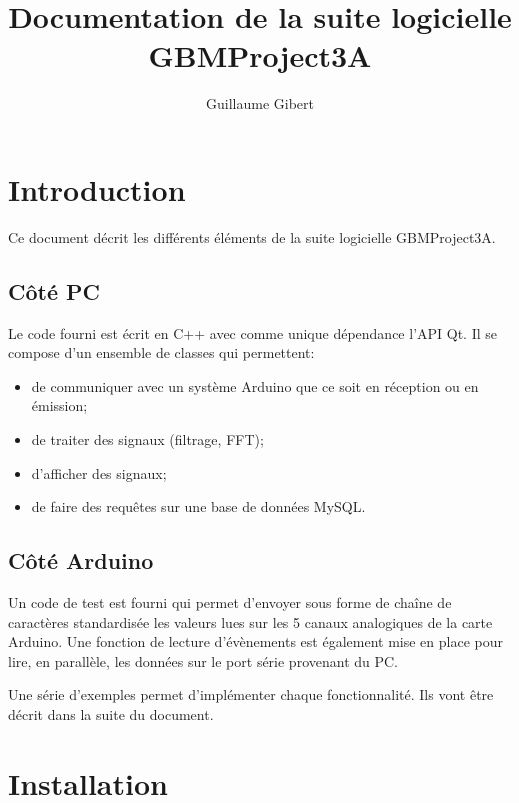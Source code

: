\documentclass{article}
\begin{document}
\title{Documentation de la suite logicielle GBMProject3A}
\author{Guillaume Gibert}
\maketitle

\section{Introduction}
Ce document décrit les différents éléments de la suite logicielle GBMProject3A.

	\subsection{Côté PC}
Le code fourni est écrit en C++ avec comme unique dépendance l'API Qt.
Il se compose d'un ensemble de classes qui permettent:
\begin{itemize}
	\item de communiquer avec un système Arduino que ce soit en réception ou en émission;
	\item de traiter des signaux (filtrage, FFT);
	\item d'afficher des signaux;
	\item de faire des requêtes sur une base de données MySQL.
\end{itemize}

	\subsection{Côté Arduino}
Un code de test est fourni qui permet d'envoyer sous forme de chaîne de caractères standardisée les valeurs lues sur les 5 canaux analogiques de la carte Arduino.
 Une fonction de lecture d'évènements est également mise en place pour lire, en parallèle, les données sur le port série provenant du PC.


Une série d'exemples permet d'implémenter chaque fonctionnalité. Ils vont être décrit dans la suite du document.

\section{Installation}
\end{document}
